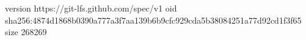 version https://git-lfs.github.com/spec/v1
oid sha256:4874d1868b0390a777a3f7aa139b6b9cfc929cda5b38084251a77d92cd1f3f65
size 268269
